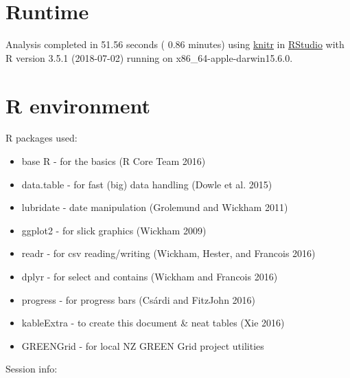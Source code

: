 \documentclass[]{article}
\providecommand{\tightlist}{%
  \setlength{\itemsep}{0pt}\setlength{\parskip}{0pt}}
\theoremstyle{definition}
\theoremstyle{definition}
\theoremstyle{definition}
\theoremstyle{remark}
\begin{document}
\section{Runtime}\label{runtime}

Analysis completed in 51.56 seconds ( 0.86 minutes) using
\href{https://cran.r-project.org/package=knitr}{knitr} in
\href{http://www.rstudio.com}{RStudio} with R version 3.5.1 (2018-07-02)
running on x86\_64-apple-darwin15.6.0.

\section{R environment}\label{r-environment}

R packages used:

\begin{itemize}
\tightlist
\item
  base R - for the basics (R Core Team 2016)
\item
  data.table - for fast (big) data handling (Dowle et al. 2015)
\item
  lubridate - date manipulation (Grolemund and Wickham 2011)
\item
  ggplot2 - for slick graphics (Wickham 2009)
\item
  readr - for csv reading/writing (Wickham, Hester, and Francois 2016)
\item
  dplyr - for select and contains (Wickham and Francois 2016)
\item
  progress - for progress bars (Csárdi and FitzJohn 2016)
\item
  kableExtra - to create this document \& neat tables (Xie 2016)
\item
  GREENGrid - for local NZ GREEN Grid project utilities
\end{itemize}

Session info:
\end{document}
